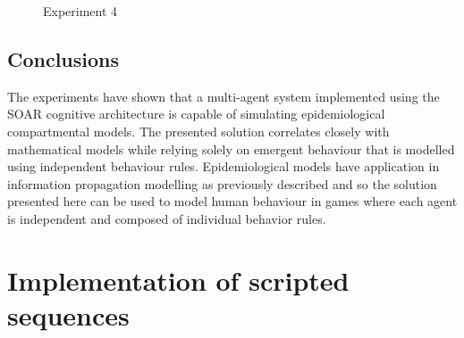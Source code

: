 \begin{figure}[H]
    \centering
    \hspace*{\fill}
    \hspace*{\fill}

    \caption{Experiment 4} \label{fig:experiment3}
\end{figure}

\subsection{Conclusions}

The experiments have shown that a multi-agent system implemented using the SOAR cognitive architecture is capable of simulating epidemiological compartmental models.
The presented solution correlates closely with mathematical models while relying solely on emergent behaviour that is modelled using independent behaviour rules.
Epidemiological models have application in information propagation modelling as previously described and so the solution presented here can be used to model human behaviour in games where each agent is independent and composed of individual behavior rules.

\section{Implementation of scripted sequences}

